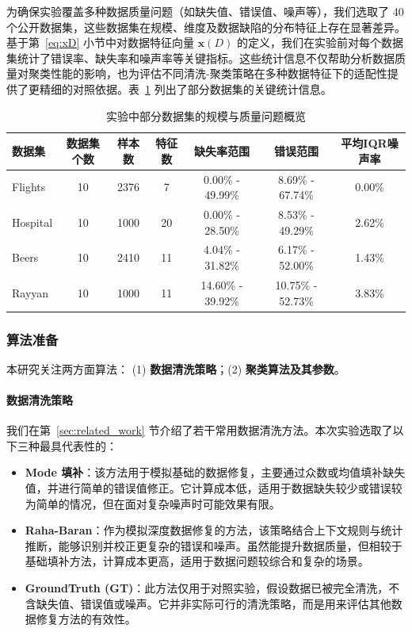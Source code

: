 \documentclass[10pt]{article} %
\numberwithin{equation}{section}
\begin{document}
为确保实验覆盖多种数据质量问题（如缺失值、错误值、噪声等），我们选取了 40 个公开数据集，这些数据集在规模、维度及数据缺陷的分布特征上存在显著差异。基于第~\ref{eq:xD} 小节中对数据特征向量 $\mathbf{x}(D)$ 的定义，我们在实验前对每个数据集统计了错误率、缺失率和噪声率等关键指标。这些统计信息不仅帮助分析数据质量对聚类性能的影响，也为评估不同清洗-聚类策略在多种数据特征下的适配性提供了更精细的对照依据。表~\ref{tab:datasets_info} 列出了部分数据集的关键统计信息。


\begin{table}[htbp]
    \centering
    \caption{实验中部分数据集的规模与质量问题概览}
    \label{tab:datasets_info}
    \begin{tabular}{lcccccc}
    \toprule
    \textbf{数据集} & \textbf{数据集个数} & \textbf{样本数} & \textbf{特征数} & \textbf{缺失率范围} & \textbf{错误范围} & \textbf{平均IQR噪声率} \\
    \midrule
    Flights  & 10  & 2376   & 7  & 0.00\% - 49.99\% & 8.69\% - 67.74\%  & 0.00\%  \\
    Hospital & 10  & 1000   & 20 & 0.00\% - 28.50\% & 8.53\% - 49.29\%  & 2.62\%  \\
    Beers    & 10  & 2410   & 11 & 4.04\% - 31.82\% & 6.17\% - 52.00\%  & 1.43\%  \\
    Rayyan   & 10  & 1000   & 11 & 14.60\% - 39.92\% & 10.75\% - 52.73\% & 3.83\%  \\
    \bottomrule
    \end{tabular}
\end{table}

\subsubsection{算法准备}
\label{sec:algo_prep}

本研究关注两方面算法：
(1) \textbf{数据清洗策略}；(2) \textbf{聚类算法及其参数}。

\paragraph{数据清洗策略}
我们在第~\ref{sec:related_work} 节介绍了若干常用数据清洗方法。本次实验选取了以下三种最具代表性的：
\begin{itemize}
	\item \textbf{Mode 填补}：该方法用于模拟基础的数据修复，主要通过众数或均值填补缺失值，并进行简单的错误值修正。它计算成本低，适用于数据缺失较少或错误较为简单的情况，但在面对复杂噪声时可能效果有限。
	\item \textbf{Raha-Baran}：作为模拟深度数据修复的方法，该策略结合上下文规则与统计推断，能够识别并校正更复杂的错误和噪声。虽然能提升数据质量，但相较于基础填补方法，计算成本更高，适用于数据问题较综合和复杂的场景。
	\item \textbf{GroundTruth (GT)}：此方法仅用于对照实验，假设数据已被完全清洗，不含缺失值、错误值或噪声。它并非实际可行的清洗策略，而是用来评估其他数据修复方法的有效性。

\end{itemize}
\end{document}
